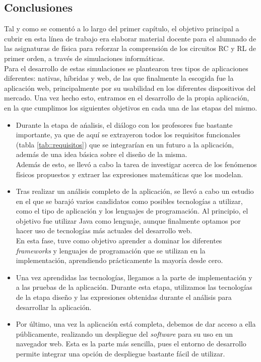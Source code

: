 \documentclass[../main.tex]{subfiles}
\begin{document}
\subsection{Conclusiones}
Tal y como se comentó a lo largo del primer capítulo, el objetivo principal a cubrir en esta línea de trabajo era elaborar material docente para el alumnado de las asignaturas de física para reforzar la comprensión de los circuitos RC y RL de primer orden, a través de simulaciones informáticas.\\ 

Para el desarrollo de estas simulaciones se plantearon tres tipos de aplicaciones diferentes: nativas, híbridas y web, de las que finalmente la escogida fue la aplicación web, principalmente por su usabilidad en los diferentes dispositivos del mercado. Una vez hecho esto, entramos en el desarrollo de la propia aplicación, en la que cumplimos los siguientes objetivos en cada una de las etapas del mismo. \\

\begin{itemize}
    \item Durante la etapa de ańalisis, el diálogo con los profesores fue bastante importante, ya que de aquí se extrayeron todos los requisitos funcionales (tabla \ref{tab::requisitos}) que se integrarían en un futuro a la aplicación, además de una idea básica sobre el diseño de la misma.\\ 
    
    Además de esto, se llevó a cabo la tarea de investigar acerca de los fenómenos físicos propuestos y extraer las expresiones matemáticas que los modelan. 

    \item Tras realizar un análisis completo de la aplicación, se llevó a cabo un estudio en el que se barajó varios candidatos como posibles tecnologías a utilizar, como el tipo de aplicación y los lenguajes de programación. Al principio, el objetivo fue utilizar Java como lenguaje, aunque finalmente optamos por hacer uso de tecnologías más actuales del desarrollo web.\\ 
    
    En esta fase, tuve como objetivo aprender a dominar los diferentes \textit{frameworks} y lenguajes de programación que se utilizan en la implementación, aprendiendo prácticamente la mayoría desde cero.

    \item Una vez aprendidas las tecnologías, llegamos a la parte de implementación y a las pruebas de la aplicación. Durante esta etapa,  utilizamos las tecnologías de la etapa diseño y las expresiones obtenidas durante el análisis para desarrollar la aplicación.\\ 
    
    \item Por último, una vez la aplicación está completa, debemos de dar acceso a ella públicamente, realizando un despliegue del \textit{software} para su uso en un navegador web. Esta es la parte más sencilla, pues el entorno de desarrollo permite integrar una opción de despliegue bastante fácil de utilizar.
\end{itemize}
\end{document}
